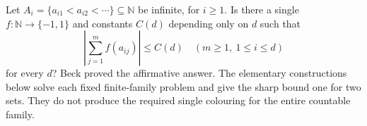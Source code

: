 Let $A_i=\{a_{i1}<a_{i2}<\cdots\}\subseteq\mathbb N$ be infinite,
for $i\geq1$. Is there a single $f:\mathbb N\to\{-1,1\}$ and constants
$C(d)$ depending only on $d$ such that
\[
 \left|\sum_{j=1}^m f(a_{ij})\right|\leq C(d)
 \quad(m\geq1,\ 1\leq i\leq d)
\]
for every $d$? Beck proved the affirmative answer. The elementary
constructions below solve each fixed finite-family problem and give
the sharp bound one for two sets. They do not produce the required
single colouring for the entire countable family.
